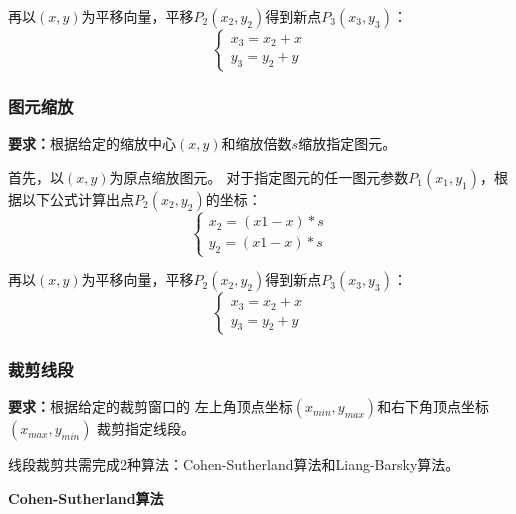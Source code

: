 \documentclass[a4paper,UTF8]{article}
\theoremstyle{definition}
\begin{document}
再以$(x,y)$为平移向量，平移$P_2(x_2,y_2)$得到新点$P_3(x_3,y_3)$：
\begin{equation*}
    \begin{cases}
        x_3=x_2+x\\
        y_3=y_2+y
    \end{cases}
\end{equation*}


\subsubsection{图元缩放}
\textbf{要求：}根据给定的缩放中心$(x,y)$和缩放倍数$s$缩放指定图元。

首先，以$(x,y)$为原点缩放图元。
对于指定图元的任一图元参数$P_1(x_1,y_1)$，根据以下公式计算出点$P_2(x_2,y_2)$的坐标：
\begin{equation*}
    \begin{cases}
        x_2=(x1-x)*s\\
        y_2=(x1-x)*s
    \end{cases}
\end{equation*}

再以$(x,y)$为平移向量，平移$P_2(x_2,y_2)$得到新点$P_3(x_3,y_3)$：
\begin{equation*}
    \begin{cases}
        x_3=x_2+x\\
        y_3=y_2+y
    \end{cases}
\end{equation*}


\subsubsection{裁剪线段}
\textbf{要求：}根据给定的裁剪窗口的
左上角顶点坐标$(x_{min},y_{max})$和右下角顶点坐标$(x_{max},y_{min})$
裁剪指定线段。

线段裁剪共需完成2种算法：Cohen-Sutherland算法和Liang-Barsky算法。

\textbf{Cohen-Sutherland算法}
\end{document}
